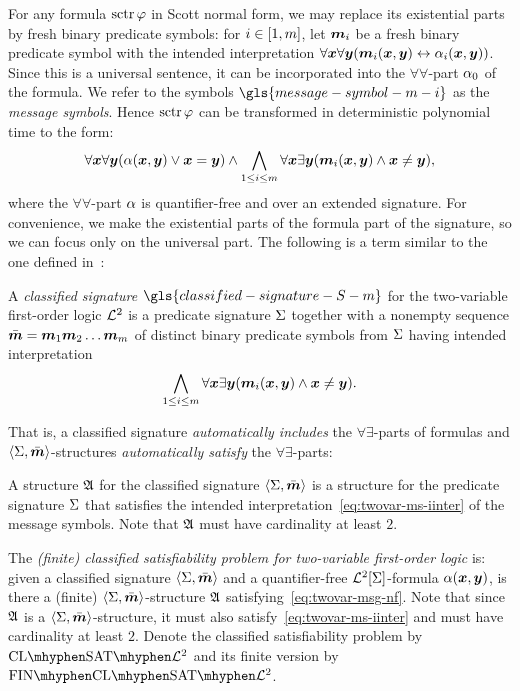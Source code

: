 For any formula $\operatorname{sctr}\varphi$ in Scott normal form, we may replace its
existential parts by fresh binary predicate symbols: for $i \in [1,m]$, let
$\bm{m}_{i}$ be a fresh binary predicate symbol with the intended interpretation
$\forall\bm{x}\forall\bm{y} (\bm{m}_{i}(\bm{x},\bm{y}) \leftrightarrow \alpha_{i}(\bm{x},\bm{y}))$. Since this
is a universal sentence, it can be incorporated into the $\forall\forall$-part
$\alpha_{0}$ of the formula.
We refer to the symbols $\gls{message-symbol-m-i}$ as the \emph{message
symbols}.
Hence $\operatorname{sctr}\varphi$ can be transformed in deterministic polynomial time to the
form:
\begin{equation}\label{eq:twovar-msg-nf}
  \forall\xx\forall\yy (\falp(\xx,\yy) \lor \xx = \yy) \land
  \bigwedge_{1 \leq \ii \leq \nm} \forall\xx\exists\yy
  (\smm\ii(\xx,\yy) \land \xx \neq \yy),
\end{equation}
where the $\forall\forall$-part $\alpha$ is quantifier-free and over an extended
signature. For convenience, we make the existential parts of the formula part of
the signature, so we can focus only on the universal part. The following is a
term similar to the one defined in~\cite{MALQ:MALQ201400102}:
\begin{definition}
A \emph{classified signature} $\gls{classified-signature-S-m}$ for the
two-variable first-order logic $\mathcal{L}^{2}$ is a predicate signature $\mathrm{\Sigma}$ together
with a nonempty sequence $\sms = \smm1\smm2\dots\smm\nm$ of distinct binary
predicate symbols from $\mathrm{\Sigma}$ having intended interpretation
\begin{equation}\label{eq:twovar-ms-iinter}
  \bigwedge_{1 \leq \ii \leq \nm} \forall\xx\exists\yy 
  (\smm\ii(\xx,\yy) \land \xx \neq \yy).
\end{equation}
\end{definition}
That is, a classified signature \emph{automatically includes} the
$\forall\exists$-parts of formulas and $\left\langle \mathrm{\Sigma},\bar{\bm{m}} \right\rangle$-structures
\emph{automatically satisfy} the $\forall\exists$-parts:
\begin{definition}
A structure $\mathfrak{A}$ for the classified signature $\left\langle \mathrm{\Sigma},\bar{\bm{m}} \right\rangle$ is a
structure for the predicate signature $\mathrm{\Sigma}$ that satisfies the intended
interpretation~\cref{eq:twovar-ms-iinter} of the message symbols. Note that
$\mathfrak{A}$ must have cardinality at least $2$.
\end{definition}

\begin{definition}\label{def:clsig-twovar}
The \emph{(finite) classified satisfiability problem for two-variable
first-order logic} is:
given a classified signature $\left\langle \mathrm{\Sigma},\bar{\bm{m}} \right\rangle$ and a quantifier-free
$\mathcal{L}^{2}[\mathrm{\Sigma}]$-formula $\alpha(\bm{x},\bm{y})$, is there a (finite)
$\left\langle \mathrm{\Sigma},\bar{\bm{m}} \right\rangle$-structure $\mathfrak{A}$ satisfying~\cref{eq:twovar-msg-nf}.
Note that since $\mathfrak{A}$ is a $\left\langle \mathrm{\Sigma},\bar{\bm{m}} \right\rangle$-structure, it must also
satisfy~\cref{eq:twovar-ms-iinter} and must have cardinality at least $2$.
Denote the classified satisfiability problem by $\ClSat{\vFo2}$ and its finite
version by $\FinClSat{\vFo2}$.
\end{definition}

